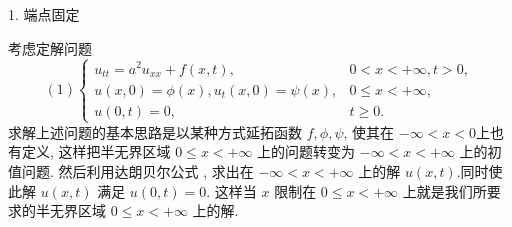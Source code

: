 1. 端点固定

考虑定解问题
$$
(1)\left\{\begin{array}{ll}
u_{t t}=a^{2} u_{x x}+f(x, t), & 0<x<+\infty, t>0, \\
u(x, 0)=\phi(x), u_{t}(x, 0)=\psi(x), & 0 \leqslant x<+\infty, \\
u(0, t)=0, & t \geqslant 0 .
\end{array}\right.
$$
求解上述问题的基本思路是以某种方式延拓函数 $ f, \phi, \psi $, 使其在 $ -\infty<x<0 $上也有定义, 这样把半无界区域 $ 0 \leqslant x<+\infty $ 上的问题转变为 $ -\infty<x<+\infty $ 上的初值问题. 然后利用达朗贝尔公式 , 求出在 $ -\infty<x<+\infty $ 上的解 $ u(x, t) $.同时使此解 $ u(x, t) $ 满足 $ u(0, t)=0 $. 这样当 $ x $ 限制在 $ 0 \leqslant x<+\infty $ 上就是我们所要求的半无界区域 $ 0 \leqslant x<+\infty $ 上的解.

